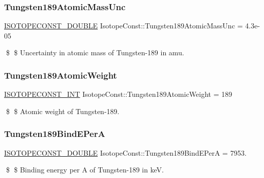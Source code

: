 \subsubsection{\texorpdfstring{Tungsten189\+Atomic\+Mass\+Unc}{Tungsten189AtomicMassUnc}}
{\footnotesize\ttfamily \mbox{\hyperlink{group___isotope_const-_macros_ga8f45a7272ce02c0b4c65c44636ed719a}{I\+S\+O\+T\+O\+P\+E\+C\+O\+N\+S\+T\+\_\+\+D\+O\+U\+B\+LE}} Isotope\+Const\+::\+Tungsten189\+Atomic\+Mass\+Unc = 4.\+3e-\/05}

\$ \$ Uncertainty in atomic mass of Tungsten-\/189 in amu. \mbox{\label{group___isotope_const-_tungsten-_w189_ga7bc2c4241c3ed407c5dce46998fd301d}} 
\subsubsection{\texorpdfstring{Tungsten189\+Atomic\+Weight}{Tungsten189AtomicWeight}}
{\footnotesize\ttfamily \mbox{\hyperlink{group___isotope_const-_macros_ga5f18360b3e99483a35c32d789e62621c}{I\+S\+O\+T\+O\+P\+E\+C\+O\+N\+S\+T\+\_\+\+I\+NT}} Isotope\+Const\+::\+Tungsten189\+Atomic\+Weight = 189}

\$ \$ Atomic weight of Tungsten-\/189. \mbox{\label{group___isotope_const-_tungsten-_w189_ga8ac4a42182577bf3eb1369bcfdc48dc5}} 
\subsubsection{\texorpdfstring{Tungsten189\+Bind\+E\+PerA}{Tungsten189BindEPerA}}
{\footnotesize\ttfamily \mbox{\hyperlink{group___isotope_const-_macros_ga8f45a7272ce02c0b4c65c44636ed719a}{I\+S\+O\+T\+O\+P\+E\+C\+O\+N\+S\+T\+\_\+\+D\+O\+U\+B\+LE}} Isotope\+Const\+::\+Tungsten189\+Bind\+E\+PerA = 7953.}

\$ \$ Binding energy per A of Tungsten-\/189 in keV. \mbox{\label{group___isotope_const-_tungsten-_w189_ga30d8acdaeb64dd8ee4100e7bdae44c91}} 
